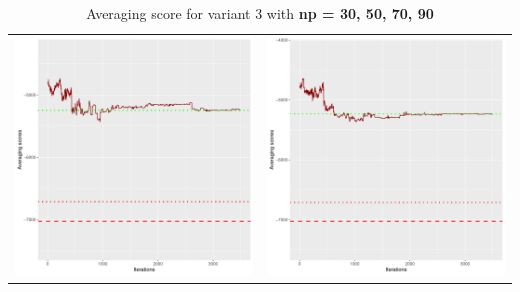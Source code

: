 \documentclass[]{scrartcl}
\begin{document}
\begin{table}[h!]
\begin{tabular}{cc}
\includegraphics[scale = 0.4]{./figs/alarm/v3/70/avgBoundsEvolution-3502.pdf} & 
\includegraphics[scale = 0.4]{./figs/alarm/v3/90/avgBoundsEvolution-3502.pdf} \\
\end{tabular}
\caption{Averaging score for variant 3 with \textbf{np =  30, 50, 70, 90 }}
\end{table}
\end{document}
